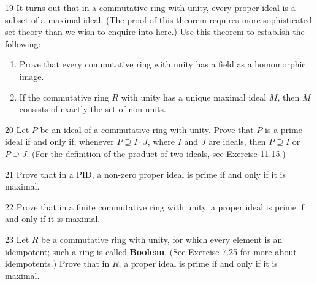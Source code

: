 \begin{problem}{19}
    It turns out that in a commutative ring with unity, every proper ideal is a subset of
    a maximal ideal. (The proof of this theorem requires more sophisticated set theory
    than we wish to enquire into here.) Use this theorem to establish the following:
    \begin{enumerate}
        \item[(a)] Prove that every commutative ring with unity has a field as a
        homomorphic image.
        \item[(b)] If the commutative ring $R$ with unity has a unique maximal ideal $M$,
        then $M$ consists of exactly the set of non-units.
    \end{enumerate}
\end{problem}
\unsolved

\begin{problem}{20}
    Let $P$ be an ideal of a commutative ring with unity. Prove that $P$ is a prime ideal
    if and only if, whenever $P \supseteq I \cdot J$, where $I$ and $J$ are ideals, then
    $P \supseteq I$ or $P \supseteq J$. (For the definition of the product of two ideals,
    see Exercise 11.15.)
\end{problem}
\unsolved

\begin{problem}{21}
    Prove that in a PID, a non-zero proper ideal is prime if and only if it is maximal.
\end{problem}
\unsolved

\begin{problem}{22}
    Prove that in a finite commutative ring with unity, a proper ideal is prime if and
    only if it is maximal.
\end{problem}
\unsolved

\begin{problem}{23}
    Let $R$ be a commutative ring with unity, for which every element is an idempotent;
    such a ring is called \textbf{Boolean}. (See Exercise 7.25 for more about
    idempotents.) Prove that in $R$, a proper ideal is prime if and only if it is maximal.
\end{problem}
\unsolved
